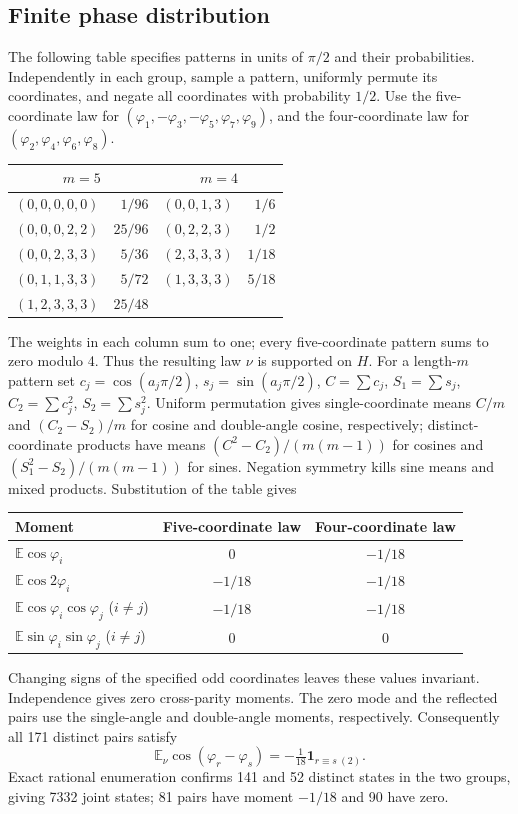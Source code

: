 \documentclass[11pt,a4paper]{article}
\begin{document}
\subsection{Finite phase distribution}
The following table specifies patterns in units of $\pi/2$ and their probabilities. Independently in each group, sample a pattern, uniformly permute its coordinates, and negate all coordinates with probability $1/2$. Use the five-coordinate law for $(\varphi_1,-\varphi_3,-\varphi_5,\varphi_7,\varphi_9)$, and the four-coordinate law for $(\varphi_2,\varphi_4,\varphi_6,\varphi_8)$.
\begin{center}\begin{tabular}{@{}lr@{\qquad}lr@{}}\toprule
\multicolumn{2}{c}{\(m=5\)}&\multicolumn{2}{c}{\(m=4\)}\\\midrule
$(0,0,0,0,0)$&$1/96$&$(0,0,1,3)$&$1/6$\\
$(0,0,0,2,2)$&$25/96$&$(0,2,2,3)$&$1/2$\\
$(0,0,2,3,3)$&$5/36$&$(2,3,3,3)$&$1/18$\\
$(0,1,1,3,3)$&$5/72$&$(1,3,3,3)$&$5/18$\\
$(1,2,3,3,3)$&$25/48$&&\\\bottomrule
\end{tabular}\end{center}
The weights in each column sum to one; every five-coordinate pattern sums to zero modulo 4. Thus the resulting law $\nu$ is supported on $H$. For a length-$m$ pattern set $c_j=\cos(a_j\pi/2)$, $s_j=\sin(a_j\pi/2)$, $C=\sum c_j$, $S_1=\sum s_j$, $C_2=\sum c_j^2$, $S_2=\sum s_j^2$. Uniform permutation gives single-coordinate means $C/m$ and $(C_2-S_2)/m$ for cosine and double-angle cosine, respectively; distinct-coordinate products have means $(C^2-C_2)/(m(m-1))$ for cosines and $(S_1^2-S_2)/(m(m-1))$ for sines. Negation symmetry kills sine means and mixed products. Substitution of the table gives
\begin{center}\begin{tabular}{lcc}\toprule
Moment & Five-coordinate law & Four-coordinate law\\\midrule
$\mathbb E\cos\varphi_i$ & $0$ & $-1/18$\\
$\mathbb E\cos 2\varphi_i$ & $-1/18$ & $-1/18$\\
$\mathbb E\cos\varphi_i\cos\varphi_j$ ($i\ne j$)&$-1/18$&$-1/18$\\
$\mathbb E\sin\varphi_i\sin\varphi_j$ ($i\ne j$)&$0$&$0$\\\bottomrule
\end{tabular}\end{center}
Changing signs of the specified odd coordinates leaves these values invariant. Independence gives zero cross-parity moments. The zero mode and the reflected pairs use the single-angle and double-angle moments, respectively. Consequently all 171 distinct pairs satisfy
\[
\mathbb E_\nu\cos(\varphi_r-\varphi_s)=-\tfrac1{18}\mathbf1_{r\equiv s\ (2)}.
\]
Exact rational enumeration confirms 141 and 52 distinct states in the two groups, giving 7332 joint states; 81 pairs have moment $-1/18$ and 90 have zero.
\end{document}
